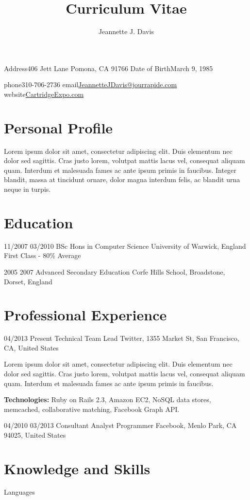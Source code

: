 \documentclass[10pt]{article} %
\title{Curriculum Vitae}
\author{Jeannette J. Davis}
\begin{document}
\makecvtitle

\begin{cvinfosection}{
  \begin{cvinfo}
    {Address}{406 Jett Lane}
    {}{Pomona, CA 91766}
    {Date of Birth}{March 9, 1985}
    {}{}
  \end{cvinfo}
}
{
  \begin{cvinfo}
    {phone}{310-706-2736}
    {email}{\href{mailto:JeannetteJDavis@jourrapide.com}{JeannetteJDavis@jourrapide.com}}
    {website}{\href{http://CartridgeExpo.com}{CartridgeExpo.com}}
    {}{}
  \end{cvinfo}
}
\end{cvinfosection}

\section*{Personal Profile}

Lorem ipsum dolor sit amet, consectetur adipiscing elit. Duis elementum nec dolor sed sagittis. Cras justo lorem, volutpat mattis lacus vel, consequat aliquam quam. Interdum et malesuada fames ac ante ipsum primis in faucibus. Integer blandit, massa at tincidunt ornare, dolor magna interdum felis, ac blandit urna neque in turpis.

\section*{Education}

\timeframe
  {11/2007}
  {03/2010}
  {BSc Hons in Computer Science}
  {University of Warwick, England}
  {First Class - 80\% Average}

\timeframeshort
  {2005}
  {2007}
  {Advanced Secondary Education}
  {Corfe Hills School, Broadstone, Dorset, England}

\section*{Professional Experience}

\timeframe
  {04/2013}
  {Present}
  {Technical Team Lead}
  {Twitter, 1355 Market St, San Francisco, CA, United States}
  {Lorem ipsum dolor sit amet, consectetur adipiscing elit. Duis
    elementum nec dolor sed sagittis. Cras justo lorem, volutpat
    mattis lacus vel, consequat aliquam quam. Interdum et malesuada
    fames ac ante ipsum primis in faucibus.
    \rule{0mm}{5mm}\textbf{Technologies:} Ruby on Rails 2.3, Amazon
    EC2, NoSQL data stores, memcached, collaborative matching,
    Facebook Graph API.}

\timeframeshort
  {04/2010}
  {03/2013}
  {Consultant Analyst Programmer}
  {Facebook, Menlo Park, CA 94025, United States}

\section*{Knowledge and Skills}

\begin{skillgroup}{Languages}
\end{skillgroup}
\end{document}
